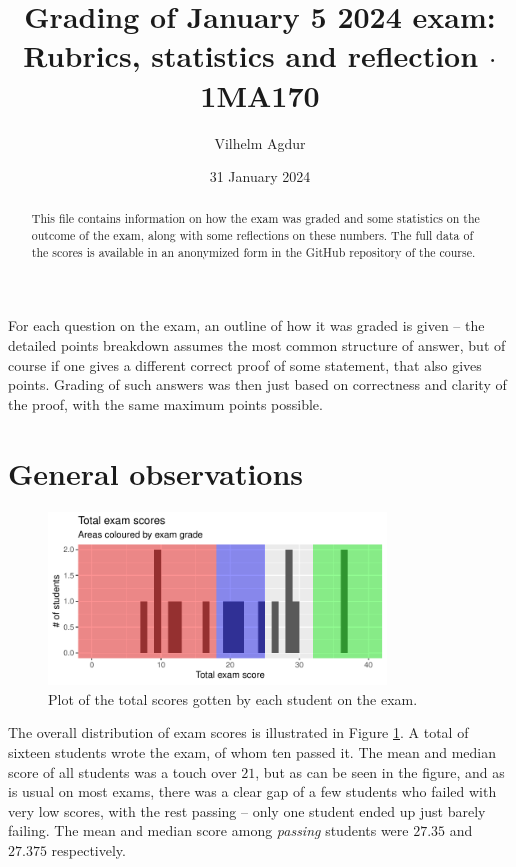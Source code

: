 \documentclass[nobib]{tufte-handout}
\title{Grading of January 5 2024 exam: Rubrics, statistics and reflection $\cdot$ 1MA170}
\author[Vilhelm Agdur]{Vilhelm Agdur}
\date{31 January 2024}
\begin{document}
\maketitle%

\begin{abstract}
\noindent
This file contains information on how the exam was graded and some statistics on the outcome of the exam, along with some reflections on these numbers. The full data of the scores is available in an anonymized form in the GitHub repository of the course.
\end{abstract}

For each question on the exam, an outline of how it was graded is given -- the detailed points breakdown assumes the most common structure of answer, but of course if one gives a different correct proof of some statement, that also gives points. Grading of such answers was then just based on correctness and clarity of the proof, with the same maximum points possible.

\section{General observations}

\begin{figure}
  \centering
  \includegraphics[width = 0.8\textwidth]{totalscore.pdf}
  \caption[Total score figure]{Plot of the total scores gotten by each student on the exam.}
  \label{fig:total_scores}
\end{figure}

The overall distribution of exam scores is illustrated in Figure \ref{fig:total_scores}. A total of sixteen students wrote the exam, of whom ten passed it. The mean and median score of all students was a touch over $21$, but as can be seen in the figure, and as is usual on most exams, there was a clear gap of a few students who failed with very low scores, with the rest passing -- only one student ended up just barely failing. The mean and median score among \emph{passing} students were $27.35$ and $27.375$ respectively.
\end{document}
